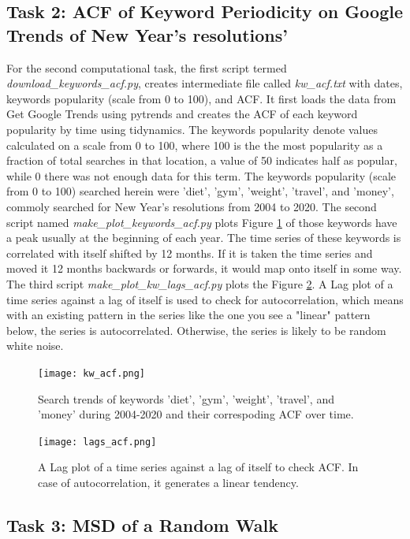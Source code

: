\documentclass{article}
\begin{document}
\subsection{Task 2: ACF of Keyword Periodicity on Google Trends of New Year's resolutions'}

For the second computational task, the first script termed {\it download\_keywords\_acf.py}, creates intermediate file called {\it kw\_acf.txt} with dates, keywords popularity (scale from 0 to 100), and ACF. It first loads the data from Get Google Trends using pytrends and creates the ACF of each keyword popularity by time using tidynamics. The keywords popularity denote values calculated on a scale from 0 to 100, where 100 is the the most popularity as a fraction of total searches in that location, a value of 50 indicates half as popular, while 0 there was not enough data for this term. The keywords popularity (scale from 0 to 100) searched herein were 'diet', 'gym', 'weight', 'travel', and 'money', commoly searched for New Year's resolutions from 2004 to 2020. The second script named {\it make\_plot\_keywords\_acf.py} plots Figure \ref{fig:acf2_plot} of those keywords have a peak usually at the beginning of each year. The time series of these keywords is correlated with itself shifted by 12 months. If it is taken the time series and moved it 12 months backwards or forwards, it would map onto itself in some way. The third script {\it make\_plot\_kw\_lags\_acf.py} plots the Figure \ref{fig:lags_plot}. A Lag plot of a time series against a lag of itself is used to check for autocorrelation, which means with an existing pattern in the series like the one you see a "linear" pattern below, the series is autocorrelated. Otherwise, the series is likely to be random white noise.

\begin{figure}[H]
\centering
\texttt{[image: kw\_acf.png]}
\caption{Search trends of keywords 'diet', 'gym', 'weight', 'travel', and 'money' during 2004-2020 and their correspoding ACF over time.}
\label{fig:acf2_plot}
\end{figure}

\begin{figure}[H]
\centering
\texttt{[image: lags\_acf.png]}
\caption{A Lag plot of a time series against a lag of itself to check ACF. In case of autocorrelation, it generates a linear tendency.}
\label{fig:lags_plot}
\end{figure}

\subsection{Task 3: MSD of a Random Walk}
\end{document}
